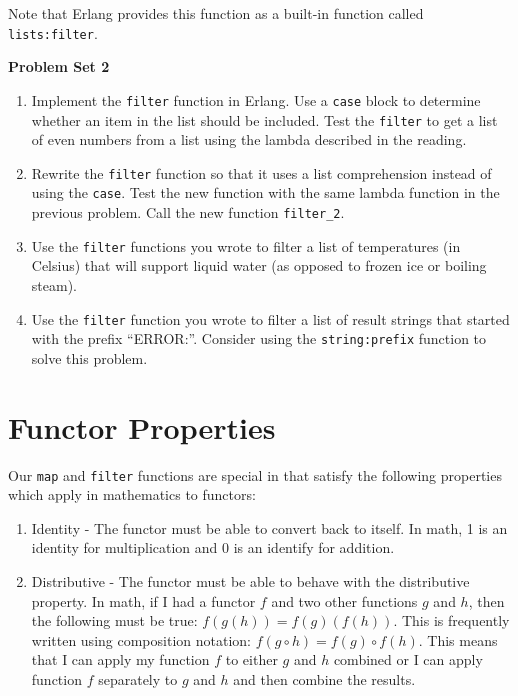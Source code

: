 \documentclass[
]{book}
\providecommand{\tightlist}{%
  \setlength{\itemsep}{0pt}\setlength{\parskip}{0pt}}
\begin{document}
Note that Erlang provides this function as a built-in function called \texttt{lists:filter}.

\begin{problembox}

\textbf{Problem Set 2}

\begin{enumerate}
\def\labelenumi{\arabic{enumi}.}
\tightlist
\item
  Implement the \texttt{filter} function in Erlang. Use a \texttt{case} block to determine whether an item in the list should be included. Test the \texttt{filter} to get a list of even numbers from a list using the lambda described in the reading.
\item
  Rewrite the \texttt{filter} function so that it uses a list comprehension instead of using the \texttt{case}. Test the new function with the same lambda function in the previous problem. Call the new function \texttt{filter\_2}.
\item
  Use the \texttt{filter} functions you wrote to filter a list of temperatures (in Celsius) that will support liquid water (as opposed to frozen ice or boiling steam).
\item
  Use the \texttt{filter} function you wrote to filter a list of result strings that started with the prefix ``ERROR:''. Consider using the \texttt{string:prefix} function to solve this problem.
\end{enumerate}

\end{problembox}

\hypertarget{functor-properties}{%
\section{Functor Properties}\label{functor-properties}}

Our \texttt{map} and \texttt{filter} functions are special in that satisfy the following properties which apply in mathematics to functors:

\begin{enumerate}
\def\labelenumi{\arabic{enumi}.}
\tightlist
\item
  Identity - The functor must be able to convert back to itself. In math, 1 is an identity for multiplication and 0 is an identify for addition.\\
\item
  Distributive - The functor must be able to behave with the distributive property. In math, if I had a functor \(f\) and two other functions \(g\) and \(h\), then the following must be true: \(f(g(h)) = f(g)(f(h))\). This is frequently written using composition notation: \(f(g \circ h) = f(g) \circ f(h)\). This means that I can apply my function \(f\) to either \(g\) and \(h\) combined or I can apply function \(f\) separately to \(g\) and \(h\) and then combine the results.
\end{enumerate}
\end{document}
